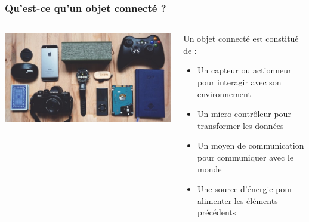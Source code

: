 \documentclass[aspectratio=169,utf8]{beamer}
\begin{document}
\begin{frame}
  \frametitle{Qu'est-ce qu'un objet connecté ?}
  \begin{columns}
    \begin{column}{.4\textwidth}
      \includegraphics[width=\textwidth]{objetsconnectes.jpg}
    \end{column}
    \begin{column}{.6\textwidth}
      Un objet connecté est constitué de :
      \begin{itemize}
        \item Un capteur ou actionneur pour interagir avec son environnement
        \item Un micro-contrôleur pour transformer les données
        \item Un moyen de communication pour communiquer avec le monde
        \item Une source d’énergie pour alimenter les éléments précédents
      \end{itemize}
    \end{column}
  \end{columns}
\end{frame}
\end{document}
